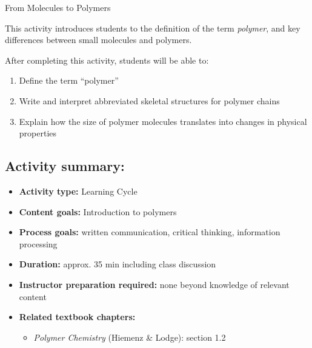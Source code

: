 %
%
%
%

\renewcommand{\figpath}{content/intro/molecules-to-polymers/figs}
\renewcommand{\labelbase}{molecules-to-polymers}

\begin{activity}{From Molecules to Polymers}

\begin{instructornotes}

	This activity introduces students to the definition of the term \emph{polymer}, and key differences between small molecules and polymers.
	
	After completing this activity, students will be able to:
			\begin{enumerate}
				\item Define the term ``polymer''
				\item Write and interpret abbreviated skeletal structures for polymer chains
				\item Explain how the size of polymer molecules translates into changes in physical properties
			\end{enumerate}
			
	\subsection*{Activity summary:}
	\begin{itemize}
		\item \textbf{Activity type:} Learning Cycle
		\item \textbf{Content goals:} Introduction to polymers
		\item \textbf{Process goals:} %
			written communication, critical thinking, information processing
		\item \textbf{Duration:} approx. 35 min including class discussion
	
		\item \textbf{Instructor preparation required:} none beyond knowledge of relevant content
		\item \textbf{Related textbook chapters:}
			\begin{itemize}
				\item \emph{Polymer Chemistry} (Hiemenz \& Lodge): section 1.2
			\end{itemize}
	\end{itemize}


\end{instructornotes}
\end{activity}

